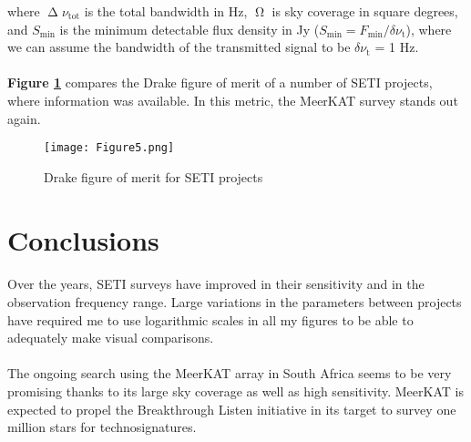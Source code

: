 \documentclass{article}
\begin{document}
where $\upDelta \nu_{\textrm{tot}}$ is the total bandwidth in Hz, $\upOmega$ is sky coverage in square degrees, and $S_{\textrm{min}}$ is the minimum detectable flux density in Jy ($S_{\textrm{min}} = F_{\textrm{min}} / \delta \nu_{\textrm{t}}$), where we can assume the bandwidth of the transmitted signal to be $\delta \nu_{\textrm{t}}$ = 1 Hz.

\paragraph{}
\textbf{Figure \ref{fig6}} compares the Drake figure of merit of a number of SETI projects, where information was available. In this metric, the MeerKAT survey stands out again.

\begin{figure}[H]
\begin{center}
\texttt{[image: Figure5.png]}
\caption{Drake figure of merit for SETI projects \textbf{\label{fig6}}}
\end{center}
\end{figure}


\section{Conclusions}

\paragraph{}
Over the years, SETI surveys have improved in their sensitivity and in the observation frequency range. Large variations in the parameters between projects have required me to use logarithmic scales in all my figures to be able to adequately make visual comparisons.

\paragraph{}
The ongoing search using the MeerKAT array in South Africa seems to be very promising thanks to its large sky coverage as well as high sensitivity. MeerKAT is expected to propel the Breakthrough Listen initiative in its target to survey one million stars for technosignatures.
\end{document}
